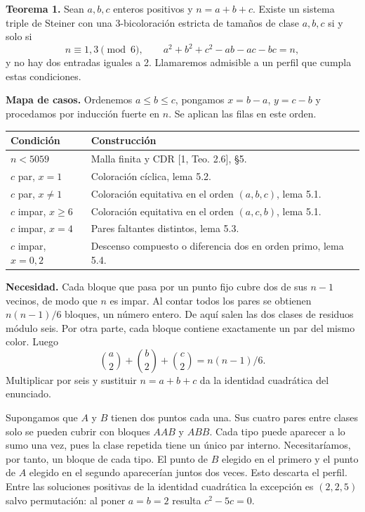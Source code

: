 \documentclass[spanish,11pt,a4paper]{article}
\begin{document}
\textbf{Teorema 1.} Sean \(a,b,c\) enteros positivos y \(n=a+b+c\). Existe un sistema triple de Steiner con una 3-bicoloración estricta de tamaños de clase \(a,b,c\) si y solo si \[n\equiv1,3\pmod6,\qquad a^2+b^2+c^2-ab-ac-bc=n,\] y no hay dos entradas iguales a 2. Llamaremos admisible a un perfil que cumpla estas condiciones.

\textbf{Mapa de casos.} Ordenemos \(a\le b\le c\), pongamos \(x=b-a\), \(y=c-b\) y procedamos por inducción fuerte en \(n\). Se aplican las filas en este orden.

{\begin{longtable}[]{@{}
  >{\raggedright\arraybackslash}p{}
  >{\raggedright\arraybackslash}p{}@{}}
\toprule\noalign{}
\begin{minipage}[b]{\linewidth}\raggedright
Condición
\end{minipage} & \begin{minipage}[b]{\linewidth}\raggedright
Construcción
\end{minipage} \\
\midrule\noalign{}
\endhead
\bottomrule\noalign{}
\endlastfoot
\(n<5059\) & Malla finita y CDR {[}1, Teo. 2.6{]}, §5. \\
\(c\) par, \(x=1\) & Coloración cíclica, lema 5.2. \\
\(c\) par, \(x\ne1\) & Coloración equitativa en el orden \((a,b,c)\), lema 5.1. \\
\(c\) impar, \(x\ge6\) & Coloración equitativa en el orden \((a,c,b)\), lema 5.1. \\
\(c\) impar, \(x=4\) & Pares faltantes distintos, lema 5.3. \\
\(c\) impar, \(x=0,2\) & Descenso compuesto o diferencia dos en orden primo, lema 5.4. \\
\end{longtable}
}

\textbf{Necesidad.} Cada bloque que pasa por un punto fijo cubre dos de sus \(n-1\) vecinos, de modo que \(n\) es impar. Al contar todos los pares se obtienen \(n(n-1)/6\) bloques, un número entero. De aquí salen las dos clases de residuos módulo seis. Por otra parte, cada bloque contiene exactamente un par del mismo color. Luego \[\binom a2+\binom b2+\binom c2=n(n-1)/6.\] Multiplicar por seis y sustituir \(n=a+b+c\) da la identidad cuadrática del enunciado.

Supongamos que \(A\) y \(B\) tienen dos puntos cada una. Sus cuatro pares entre clases solo se pueden cubrir con bloques \(AAB\) y \(ABB\). Cada tipo puede aparecer a lo sumo una vez, pues la clase repetida tiene un único par interno. Necesitaríamos, por tanto, un bloque de cada tipo. El punto de \(B\) elegido en el primero y el punto de \(A\) elegido en el segundo aparecerían juntos dos veces. Esto descarta el perfil. Entre las soluciones positivas de la identidad cuadrática la excepción es \((2,2,5)\) salvo permutación: al poner \(a=b=2\) resulta \(c^2-5c=0\).
\end{document}
